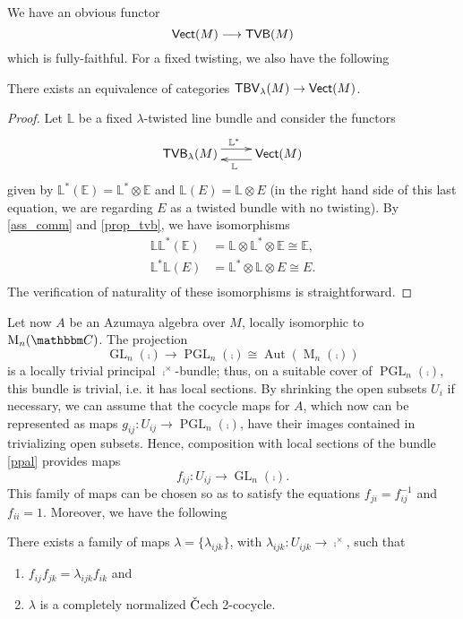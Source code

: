 We have an obvious functor
$$\mathsf{Vect}(M)\longrightarrow \mathsf{TVB}(M)$$
which is fully-faithful. For a fixed twisting, we also have the following

\begin{proposition}\label{equiv_tvb_vect}
There exists an equivalence of categories $\mathsf{TBV}_{\lambda}(M)\to \mathsf{Vect}(M)$.
\end{proposition}
\begin{proof}
Let $\mathbb{L}$ be a fixed $\lambda$-twisted line bundle and consider the functors
$$
\xymatrix{
\tsf{TVB}_{\lambda}(M)\ar@<1ex>[r]^{\mathbb{L}^*} & \tsf{Vect}(M)\ar@<1ex>[l]^{\mathbb{L}}}
$$
given by $\mathbb{L}^*(\mathbb{E})=\mathbb{L}^*\otimes \mathbb{E}$ and $\mathbb{L}(E)=\mathbb{L}\otimes E$ (in the right hand side of this last equation, we are regarding $E$ as a twisted bundle with no twisting). By \ref{ass_comm} and \ref{prop_tvb}, we have isomorphisms
$$
\begin{aligned}
\mathbb{L}\mathbb{L}^*(\mathbb{E}) &= \mathbb{L}\otimes \mathbb{L}^*\otimes \mathbb{E}\cong \mathbb{E}, \\
\mathbb{L}^*\mathbb{L}(E) &= \mathbb{L}^*\otimes \mathbb{L}\otimes E \cong E.\\
\end{aligned}
$$
The verification of naturality of these isomorphisms is straightforward.
\end{proof}

Let now $A$ be an Azumaya algebra over $M$, locally isomorphic to $\opnm{M}_n(\comp )$. The projection
\begin{equation}\label{ppal}
\operatorname{GL}_n(\comp )\to \operatorname{PGL}_n(\comp )\cong \operatorname{Aut}(\operatorname{M}_n(\comp ))
\end{equation}
is a locally trivial principal $\comp^{\times}$-bundle; thus, on a suitable cover of $\operatorname{PGL}_n(\comp )$, this bundle is trivial, i.e. it has local sections. By shrinking the open subsets $U_i$ if necessary, we can assume that the cocycle maps for $A$, which now can be represented as maps $g_{ij}:U_{ij}\to \operatorname{PGL}_n(\comp )$, have their images contained in trivializing open subsets. Hence, composition with local sections of the bundle \eqref{ppal} provides maps
$$f_{ij}:U_{ij}\to \operatorname{GL}_n(\comp ).$$
This family of maps can be chosen so as to satisfy the equations $f_{ji}=f_{ij}^{-1}$ and $f_{ii}=1$. Moreover, we have the following

\begin{lemma}
There exists a family of maps $\lambda =\{\lambda_{ijk}\}$, with $\lambda_{ijk}:U_{ijk}\to \comp^{\times}$, such that
\begin{enumerate}
\item $f_{ij}f_{jk}=\lambda_{ijk}f_{ik}$ and
\item $\lambda$ is a completely normalized $\Check{\text{C}}$ech 2-cocycle.
\end{enumerate}
\end{lemma}

